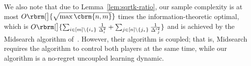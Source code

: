 We also note that due to Lemma~\ref{lem:sqrtk-ratio},
our sample complexity is at most $O\rbrm[\big]{\sqrt{\max\cbrm{n,m}}}$ times the information-theoretic optimal,
which is $O\rbrm[\big] { 
\sum_{i \in [m] \setminus \{ \istar \}} \frac{1}{{\Deltar}^2_i}
+
\sum_{j \in [n] \setminus \{ \jstar \}} \frac{1}{{\Deltac}^2_j}
}
$ and is achieved by the Midsearch algorithm of~\citet{maiti2024midsearch}.
However, their algorithm is coupled; that is, Midsearch requires the algorithm to control both players at the same time,
while our algorithm is a no-regret uncoupled learning dynamic.
